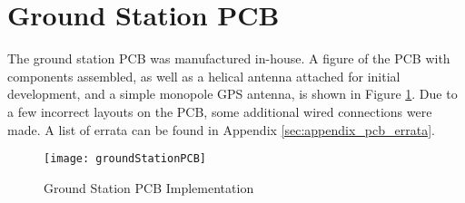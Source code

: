 \graphicspath{{./figures}}

\section{Ground Station PCB}

The ground station PCB was manufactured in-house. A figure of the PCB with components assembled, as well as a helical antenna attached for initial development, and a simple monopole GPS antenna, is shown in Figure \ref{fig:groundStationPCB}. Due to a few incorrect layouts on the PCB, some additional wired connections were made. A list of errata can be found in Appendix \ref{sec:appendix_pcb_errata}.

\begin{figure}[!htb]
  \centering
  \texttt{[image: groundStationPCB]}
  \caption{Ground Station PCB Implementation}
  \label{fig:groundStationPCB}
\end{figure}